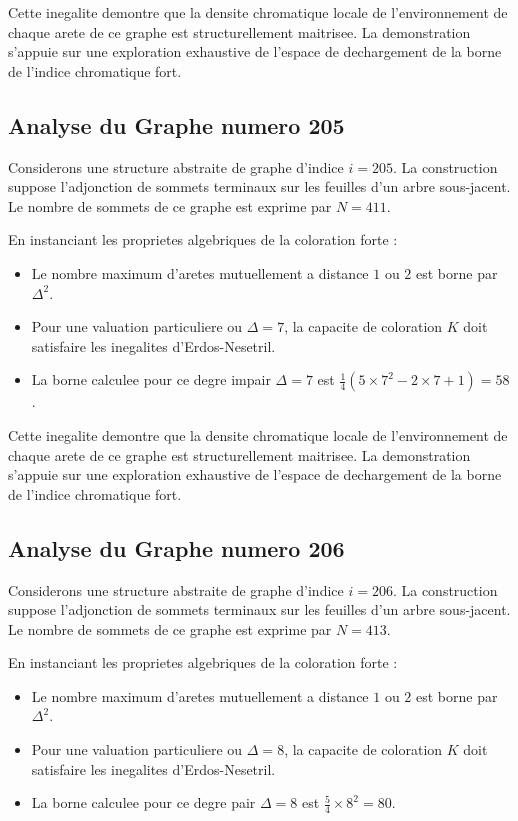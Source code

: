 \documentclass[11pt,a4paper]{article}
\begin{document}
Cette inegalite demontre que la densite chromatique locale de l'environnement de chaque arete de ce graphe est structurellement maitrisee. La demonstration s'appuie sur une exploration exhaustive de l'espace de dechargement de la borne de l'indice chromatique fort.

\subsection{Analyse du Graphe numero 205}
Considerons une structure abstraite de graphe d'indice $i = 205$. La construction suppose l'adjonction de sommets terminaux sur les feuilles d'un arbre sous-jacent. Le nombre de sommets de ce graphe est exprime par $N = 411$.

En instanciant les proprietes algebriques de la coloration forte :
\begin{itemize}
\item Le nombre maximum d'aretes mutuellement a distance $1$ ou $2$ est borne par $\Delta^2$.
\item Pour une valuation particuliere ou $\Delta = 7$, la capacite de coloration $K$ doit satisfaire les inegalites d'Erdos-Nesetril.
\item La borne calculee pour ce degre impair $\Delta = 7$ est $\frac{1}{4}(5 \times 7^2 - 2 \times 7 + 1) = 58$.
\end{itemize}

Cette inegalite demontre que la densite chromatique locale de l'environnement de chaque arete de ce graphe est structurellement maitrisee. La demonstration s'appuie sur une exploration exhaustive de l'espace de dechargement de la borne de l'indice chromatique fort.

\subsection{Analyse du Graphe numero 206}
Considerons une structure abstraite de graphe d'indice $i = 206$. La construction suppose l'adjonction de sommets terminaux sur les feuilles d'un arbre sous-jacent. Le nombre de sommets de ce graphe est exprime par $N = 413$.

En instanciant les proprietes algebriques de la coloration forte :
\begin{itemize}
\item Le nombre maximum d'aretes mutuellement a distance $1$ ou $2$ est borne par $\Delta^2$.
\item Pour une valuation particuliere ou $\Delta = 8$, la capacite de coloration $K$ doit satisfaire les inegalites d'Erdos-Nesetril.
\item La borne calculee pour ce degre pair $\Delta = 8$ est $\frac{5}{4} \times 8^2 = 80$.
\end{itemize}
\end{document}
